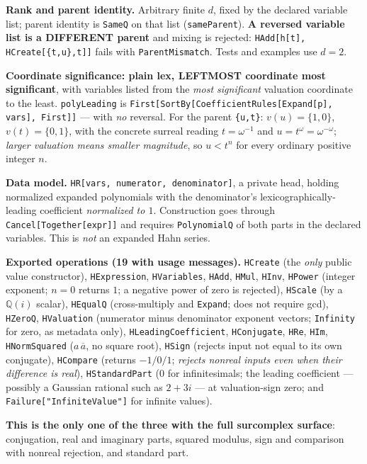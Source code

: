 \documentclass[11pt,letterpaper]{article}
\numberwithin{equation}{section}
\theoremstyle{definition}
\theoremstyle{remark}
\newcommand{\Q}{\mathbb Q}
\begin{document}
\textbf{Rank and parent identity.} Arbitrary finite $d$, fixed by the declared
variable list; parent identity is \texttt{SameQ} on that list
(\texttt{sameParent}). \textbf{A reversed variable list is a DIFFERENT parent}
and mixing is rejected: \texttt{HAdd[h[t], HCreate[\{t,u\},t]]} fails with
\texttt{ParentMismatch}. Tests and examples use $d=2$.

\textbf{Coordinate significance: plain lex, LEFTMOST coordinate most
significant}, with variables listed from the \emph{most significant} valuation
coordinate to the least. \texttt{polyLeading} is
\texttt{First[SortBy[CoefficientRules[Expand[p], vars], First]]} --- with
\emph{no} reversal. For the parent \texttt{\{u,t\}}: $v(u)=\{1,0\}$,
$v(t)=\{0,1\}$, with the concrete surreal reading $t=\omega^{-1}$ and
$u=t^\omega=\omega^{-\omega}$; \emph{larger valuation means smaller magnitude},
so $u<t^n$ for every ordinary positive integer $n$.

\textbf{Data model.} \texttt{HR[vars, numerator, denominator]}, a private head,
holding normalized expanded polynomials with the denominator's
lexicographically-leading coefficient \emph{normalized to $1$}. Construction
goes through \texttt{Cancel[Together[expr]]} and requires \texttt{PolynomialQ}
of both parts in the declared variables. This is \emph{not} an expanded Hahn
series.

\textbf{Exported operations (19 with usage messages).} \texttt{HCreate} (the
\emph{only} public value constructor), \texttt{HExpression},
\texttt{HVariables}, \texttt{HAdd}, \texttt{HMul}, \texttt{HInv},
\texttt{HPower} (integer exponent; $n=0$ returns $1$; a negative power of zero
is rejected), \texttt{HScale} (by a $\Q(i)$ scalar), \texttt{HEqualQ}
(cross-multiply and \texttt{Expand}; does not require gcd), \texttt{HZeroQ},
\texttt{HValuation} (numerator minus denominator exponent vectors;
\texttt{Infinity} for zero, as metadata only),
\texttt{HLeadingCoefficient}, \texttt{HConjugate}, \texttt{HRe}, \texttt{HIm},
\texttt{HNormSquared} ($a\,\overline a$, no square root), \texttt{HSign}
(rejects input not equal to its own conjugate), \texttt{HCompare} (returns
$-1/0/1$; \emph{rejects nonreal inputs even when their difference is real}),
\texttt{HStandardPart} ($0$ for infinitesimals; the leading coefficient ---
possibly a Gaussian rational such as $2+3i$ --- at valuation-sign zero; and
\texttt{Failure["InfiniteValue"]} for infinite values).

\textbf{This is the only one of the three with the full surcomplex surface}:
conjugation, real and imaginary parts, squared modulus, sign and comparison with
nonreal rejection, and standard part.
\end{document}
